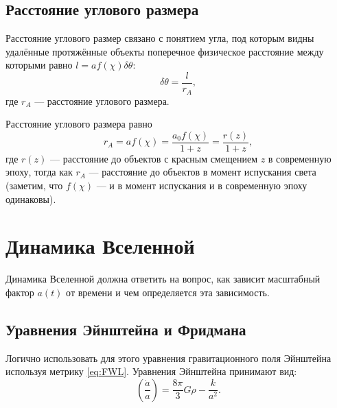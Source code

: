 \documentclass[]{article}
\begin{document}
\subsection{Расстояние углового размера}

Расстояние углового размер связано с понятием угла, под которым видны удалённые протяжённые объекты поперечное физическое расстояние  между которыми равно $l = a f(\chi) \delta\theta$:
\begin{equation*}\label{}
    \delta\theta = \frac{l}{r_A},
\end{equation*}
где $r_A$ --- расстояние углового размера.


\begin{center}
\end{center}

Расстояние углового размера равно
\[
    r_A = a f(\chi) = \frac{a_0 f(\chi)}{1 + z} = \frac{r(z)}{1 + z},
\]
где $r(z)$ --- расстояние до объектов с красным смещением $z$ в современную эпоху, тогда как $r_A$ --- расстояние до объектов в момент испускания света (заметим, что $f(\chi)$ --- и в момент испускания и в современную эпоху одинаковы).


\section{Динамика Вселенной}

Динамика Вселенной должна ответить на вопрос, как зависит масштабный фактор $a(t)$ от времени и чем определяется эта зависимость.

\subsection{Уравнения Эйнштейна и Фридмана}

Логично использовать для этого уравнения гравитационного поля Эйнштейна используя метрику \eqref{eq:FWL}.
Уравнения Эйнштейна принимают вид:
\begin{equation}\label{eq:Freiedman}
	\left( \frac{\dot{a}}{a}\right) = \frac{8\pi}{3}G \rho - \frac{k}{a^2}.
\end{equation}
\end{document}
